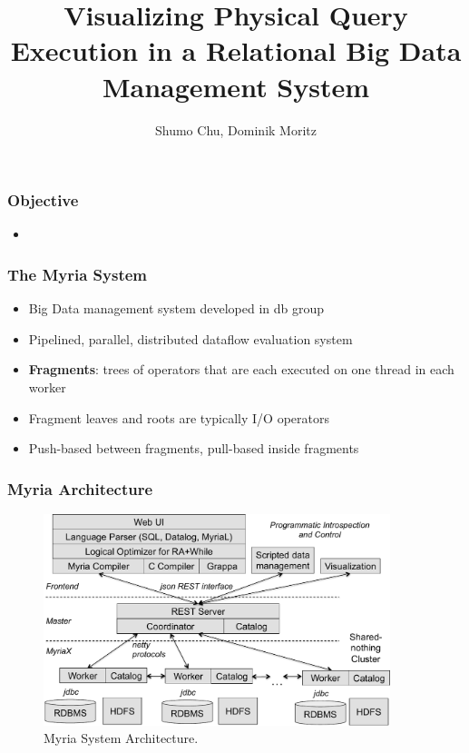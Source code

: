 \documentclass[mathserif,serif,handout]{beamer}
\title[Query Visualization] %
{Visualizing Physical Query Execution in a Relational Big Data Management System}
\subtitle{}
\author[Chu, moritz] %
{Shumo Chu, Dominik Moritz}
\begin{document}
\begin{frame}
\titlepage

\end{frame}

\begin{frame}
\frametitle{Objective}
\begin{itemize}
	\item 
\end{itemize}
\end{frame}

\begin{frame}
\frametitle{The Myria System}
\begin{itemize}
	\item Big Data management system developed in db group
	\item Pipelined, parallel, distributed dataflow evaluation system
	\item \textbf{Fragments}: trees of operators that are each executed on one thread in each worker
	\item Fragment leaves and roots are typically I/O operators
  \item Push\--based between fragments, pull\--based inside fragments
\end{itemize}
\end{frame}

\begin{frame}
\frametitle{Myria Architecture}
\begin{figure}
 \begin{center}
     \includegraphics[width=0.9\textwidth]{arch}
   \end{center}
  \caption{Myria System Architecture.}
  \label{fig:myria_arc}
\end{figure}
\end{frame}
\end{document}
